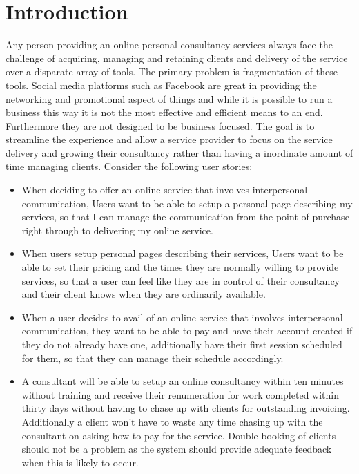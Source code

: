 \chapter{Introduction}

Any person providing an online personal consultancy services always face the challenge of acquiring, managing and retaining clients and delivery of the service over a disparate array of tools.  The primary problem is fragmentation of these tools.  Social media platforms such as Facebook are great in providing the networking and promotional aspect of things and while it is possible to run a business this way it is not the most effective and efficient means to an end.  Furthermore they are not designed to be business focused.
The goal is to streamline the experience and allow a service provider to focus on the service delivery and growing their consultancy rather than having a inordinate amount of time managing clients. Consider the following user stories:

\begin{itemize}
\item When deciding to offer an online service that involves interpersonal communication, Users want to be able to setup a personal page describing my services, so that I can manage the communication from the point of purchase right through to delivering my online service.
\item When users setup personal pages describing their services, Users want to be able to set their pricing and the times they are normally willing to provide services, so that a user can feel like they are in control of their consultancy and their client knows when they are ordinarily available.
\item When a user decides to avail of an online service that involves interpersonal communication, they want to be able to pay and have their account created if they do not already have one, additionally have their first session scheduled for them, so that they can manage their schedule accordingly.
\item A consultant will be able to setup an online consultancy within ten minutes without training and receive their renumeration for work completed within thirty days without having to chase up with clients for outstanding invoicing.  Additionally a client won’t have to waste any time chasing up with the consultant on asking how to pay for the service.  Double booking of clients should not be a problem as the system should provide adequate feedback when this is likely to occur. 
\end{itemize}